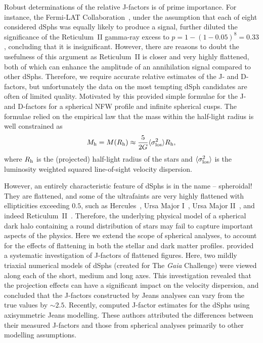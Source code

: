 \documentclass[prd,twocolumn,showpacs,preprintnumbers,superscriptaddress,nofootinbib,amsmath,amssymb,nobalancelastpage]{revtex4}
\def\rh{R_{\rm h}}
\def\Mh{M_{\rm h}}
\begin{document}
Robust determinations of the relative J-factors is of prime
importance. For instance, the Fermi-LAT
Collaboration~\cite{2015ApJ...809L...4D}, under the assumption that
each of eight considered dSphs was equally likely to produce a signal,
further diluted the significance of the Reticulum~II gamma-ray excess to $p=1 - (1-0.05)^8 = 0.33$, concluding that it is
insignificant. However, there are reasons to doubt the usefulness of
this argument as Reticulum~II is closer and very highly flattened,
both of which can enhance the amplitude of an annihilation signal compared
to other dSphs. Therefore, we require accurate relative estimates of the J- and D-factors, but unfortunately the
data on the most tempting dSph candidates are often of limited quality. Motivated
by this \cite[][~hereafter Paper I]{EvansSandersGS} provided simple formulae for
the J- and D-factors for a spherical NFW profile and infinite
spherical cusps. The formulae relied on the empirical law that the
mass within the half-light radius is well constrained as \citep{Wa09,Wo10}
%
\begin{equation}
\Mh=M(\rh)\approx \frac{5}{2G}\langle\sigma_{\rm los}^2\rangle \rh,
\label{eq:wolf}
\end{equation}
%
where $\rh$ is the (projected) half-light radius of the stars and
$\langle\sigma_{\rm los}^2\rangle$ is the luminosity weighted squared line-of-sight velocity dispersion.

However, an entirely characteristic feature of dSphs is in the name --
spheroidal! They are flattened, and some of the ultrafaints are very
highly flattened with ellipticities exceeding $0.5$, such as
Hercules~\citep{De12}, Ursa Major I~\citep{Ma08}, Ursa Major
II~\citep{Zu06}, and indeed Reticulum~II~\citep{Ko15}. Therefore, the
underlying physical model of a spherical dark halo containing a round
distribution of stars may fail to capture important aspects of the
physics. Here we extend the scope of spherical analyses, to account
for the effects of flattening in both the stellar and dark matter
profiles. \citet{Bo15d} provided a systematic investigation of J-factors of flattened figures. Here, two mildly triaxial numerical
models of dSphs (created for The {\it Gaia} Challenge) were viewed
along each of the short, medium and long axes. This investigation
revealed that the projection effects can have a significant impact on
the velocity dispersion, and concluded that the J-factors constructed
by Jeans analyses can vary from the true values by $\sim 2.5$. Recently, \cite{Hayashi2016} computed J-factor estimates for the dSphs using axisymmetric Jeans modelling. These authors attributed the differences between their measured J-factors and those from spherical analyses primarily to other modelling assumptions.
\end{document}
